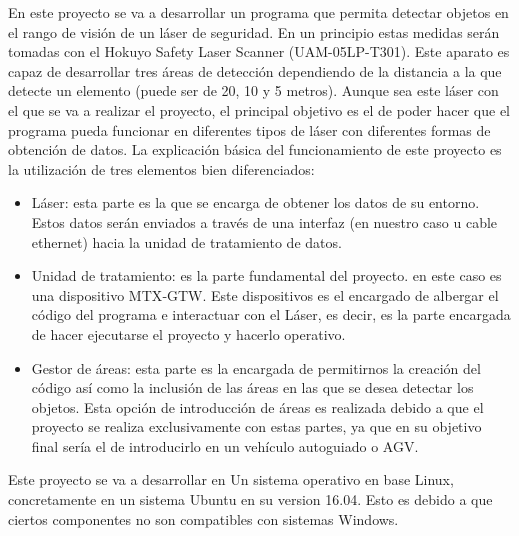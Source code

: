 
En este proyecto se va a desarrollar un programa que permita detectar objetos en el rango de visión de un láser de seguridad. En un principio estas medidas serán tomadas con el Hokuyo Safety Laser Scanner (UAM-05LP-T301). Este aparato es capaz de desarrollar tres áreas de detección dependiendo de la distancia a la que detecte un elemento (puede ser de 20, 10 y 5 metros). Aunque sea este láser con el que se va a realizar el proyecto, el principal objetivo es el de poder hacer que el programa pueda funcionar en diferentes tipos de láser con diferentes formas de obtención de datos.
La explicación básica del funcionamiento de este proyecto es la utilización de tres elementos bien diferenciados:
\begin{itemize}
    \item Láser: esta parte es la que se encarga de obtener los datos de su entorno. Estos datos serán enviados a través de una interfaz (en nuestro caso u cable ethernet) hacia la unidad de tratamiento de datos.
    \item Unidad de tratamiento: es la parte fundamental del  proyecto. en este caso es una dispositivo MTX‐GTW. Este dispositivos es el encargado de albergar el código del programa e interactuar con el Láser, es decir, es la parte encargada de hacer ejecutarse el proyecto y hacerlo operativo.
    \item Gestor de áreas: esta parte es la encargada de permitirnos la creación del código así como la inclusión de las áreas en las que se desea detectar los objetos. Esta opción de introducción de áreas es realizada debido a que el proyecto se realiza exclusivamente con estas partes, ya que en su objetivo final sería el de introducirlo en un vehículo autoguiado o AGV.
\end{itemize}

Este proyecto se va a desarrollar en Un sistema operativo en base Linux, concretamente en un sistema Ubuntu en su version 16.04. Esto es debido a que ciertos componentes no son compatibles con sistemas  Windows.
